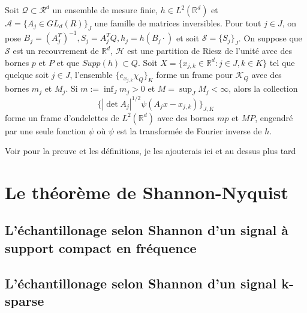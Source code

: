 \begin{theoreme}
	Soit $\mathcal{Q} \subset \mathcal{R}^d$ un ensemble de mesure finie, $h \in L^2(\mathbb{R}^d)$
	et $\mathcal{A} =\{A_j \in GL_d(R)\}_J$ une famille de matrices inversibles.
	\newline
	Pour tout $j \in J$, on pose $B_j =(A_j^T)^{-1}, S_j = A_j^TQ, h_j = h(B_j \cdot)$
	et soit $\mathcal{S} = \{S_j\}_J$.
	\newline
	On suppose que $\mathcal{S}$ est un recouvrement de $\mathbb{R}^d$, $\mathcal{H}$ est une partition de Riesz de l'unité avec des bornes $p$ et $P$ et que $Supp(h) \subset Q$.
	\newline
	Soit $X = \{x_{j,k} \in \mathbb{R}^d : j\in J, k \in K\}$ tel que quelque soit $j \in J$, 
	l'ensemble $\{e_{x_{j,k}}\chi_Q\}_K$ forme un frame pour $\mathcal{K}_Q$ avec des bornes $m_j$ et $M_j$. 
	\newline
	Si $m := \inf_J m_j > 0$ et $M= \sup_J M_j < \infty$, alors la collection
	\begin{equation*}
		\{|\det A_j|^{1/2} \psi(A_j x - x_{j,k})\}_{J, K}
	\end{equation*}
	forme un frame d'ondelettes de $L^2(\mathbb{R}^d)$ avec des bornes $mp$ et $MP$, 
	engendré par une seule fonction $\psi$ où $\psi$ est la transformée de Fourier inverse de $h$.
\end{theoreme}
\begin{preuve}
	Voir \cite{IrregWav} pour la preuve et les définitions, je les ajouterais ici et au dessus plus tard %
\end{preuve}
\section{Le théorème de Shannon-Nyquist}
\subsection{L'échantillonage selon Shannon d'un signal à support compact en fréquence}
\subsection{L'échantillonage selon Shannon d'un signal k-sparse}

